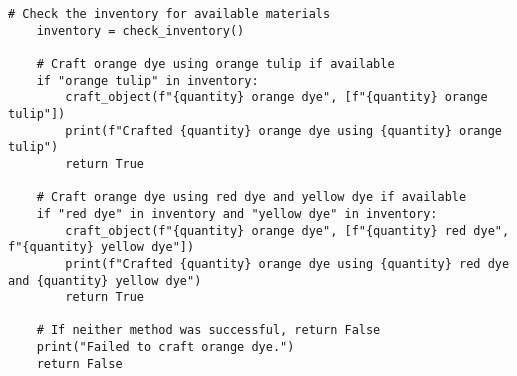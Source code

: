 \begin{tcolorbox}[title=Tools for TextCraft, width=\textwidth,top=0mm, breakable]
\begin{Verbatim}[breaklines=true, breakanywhere=true, fontsize=\footnotesize]
    # Check the inventory for available materials
    inventory = check_inventory()
    
    # Craft orange dye using orange tulip if available
    if "orange tulip" in inventory:
        craft_object(f"{quantity} orange dye", [f"{quantity} orange tulip"])
        print(f"Crafted {quantity} orange dye using {quantity} orange tulip")
        return True
    
    # Craft orange dye using red dye and yellow dye if available
    if "red dye" in inventory and "yellow dye" in inventory:
        craft_object(f"{quantity} orange dye", [f"{quantity} red dye", f"{quantity} yellow dye"])
        print(f"Crafted {quantity} orange dye using {quantity} red dye and {quantity} yellow dye")
        return True
    
    # If neither method was successful, return False
    print("Failed to craft orange dye.")
    return False
\end{Verbatim}
\end{tcolorbox}


